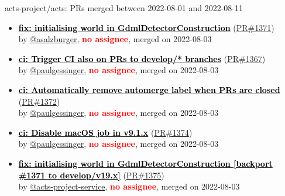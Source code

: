 \begin{frame}[allowframebreaks]{ acts-project/acts: PRs merged 
between 2022-08-01 and 2022-08-11
}
\begin{itemize}
    \item\prmerged
    \hspace*{0.1em}
    \textbf{\href{https://github.com/acts-project/acts/pull/1371}{\textcolor{black}{fix: initialising world in GdmlDetectorConstruction}}}
    (\href{https://github.com/acts-project/acts/pull/1371}{PR\#1371}) \\
    by \href{https://github.com/asalzburger}{@asalzburger}, {}\textbf{\textcolor{Red}{no assignee}}, merged on 2022-08-03

    \item\prmerged
    \hspace*{0.1em}
    \textbf{\href{https://github.com/acts-project/acts/pull/1367}{\textcolor{black}{ci: Trigger CI also on PRs to develop/* branches}}}
    (\href{https://github.com/acts-project/acts/pull/1367}{PR\#1367}) \\
    by \href{https://github.com/paulgessinger}{@paulgessinger}, {}\textbf{\textcolor{Red}{no assignee}}, merged on 2022-08-03

    \item\prmerged
    \hspace*{0.1em}
    \textbf{\href{https://github.com/acts-project/acts/pull/1372}{\textcolor{black}{ci: Automatically remove automerge label when PRs are closed}}}
    (\href{https://github.com/acts-project/acts/pull/1372}{PR\#1372}) \\
    by \href{https://github.com/paulgessinger}{@paulgessinger}, {}\textbf{\textcolor{Red}{no assignee}}, merged on 2022-08-03

    \item\prmerged
    \hspace*{0.1em}
    \textbf{\href{https://github.com/acts-project/acts/pull/1374}{\textcolor{black}{ci: Disable macOS job in v9.1.x}}}
    (\href{https://github.com/acts-project/acts/pull/1374}{PR\#1374}) \\
    by \href{https://github.com/paulgessinger}{@paulgessinger}, {}\textbf{\textcolor{Red}{no assignee}}, merged on 2022-08-03

    \item\prmerged
    \hspace*{0.1em}
    \textbf{\href{https://github.com/acts-project/acts/pull/1375}{\textcolor{black}{fix: initialising world in GdmlDetectorConstruction [backport \#1371 to develop/v19.x]}}}
    (\href{https://github.com/acts-project/acts/pull/1375}{PR\#1375}) \\
    by \href{https://github.com/acts-project-service}{@acts-project-service}, {}\textbf{\textcolor{Red}{no assignee}}, merged on 2022-08-03


\end{itemize}
\end{frame}
